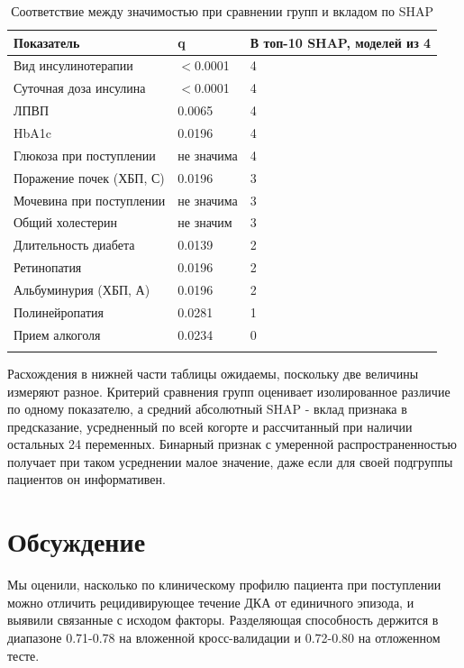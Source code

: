 \documentclass[pdflatex,sn-basic,Numbered]{sn-jnl}
\begin{document}
\begin{table}[h]
\caption{Соответствие между значимостью при сравнении групп и вкладом по SHAP}\label{tab7}%
\begin{tabular}{@{}lll@{}}
\toprule
Показатель & q & В топ-10 SHAP, моделей из 4\\
\midrule
Вид инсулинотерапии & $<$0.0001 & 4\\
Суточная доза инсулина & $<$0.0001 & 4\\
ЛПВП & 0.0065 & 4\\
HbA1c & 0.0196 & 4\\
Глюкоза при поступлении & не значима & 4\\
Поражение почек (ХБП, С) & 0.0196 & 3\\
Мочевина при поступлении & не значима & 3\\
Общий холестерин & не значим & 3\\
Длительность диабета & 0.0139 & 2\\
Ретинопатия & 0.0196 & 2\\
Альбуминурия (ХБП, А) & 0.0196 & 2\\
Полинейропатия & 0.0281 & 1\\
Прием алкоголя & 0.0234 & 0\\
\botrule
\end{tabular}
\end{table}

Расхождения в нижней части таблицы ожидаемы, поскольку две величины измеряют разное. Критерий сравнения групп оценивает изолированное различие по одному показателю, а средний абсолютный SHAP - вклад признака в предсказание, усредненный по всей когорте и рассчитанный при наличии остальных 24 переменных. Бинарный признак с умеренной распространенностью получает при таком усреднении малое значение, даже если для своей подгруппы пациентов он информативен.

\section{Обсуждение}\label{sec4}

Мы оценили, насколько по клиническому профилю пациента при поступлении можно отличить рецидивирующее течение ДКА от единичного эпизода, и выявили связанные с исходом факторы. Разделяющая способность держится в диапазоне 0.71-0.78 на вложенной кросс-валидации и 0.72-0.80 на отложенном тесте.
\end{document}
